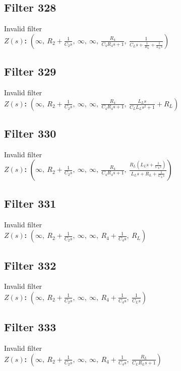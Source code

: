 \documentclass{article}
\begin{document}
\subsection*{Filter 328}
Invalid filter \\ 
\textbf{$Z(s)$:} $\left( \infty, \  R_{2} + \frac{1}{C_{2} s}, \  \infty, \  \infty, \  \frac{R_{4}}{C_{4} R_{4} s + 1}, \  \frac{1}{C_{L} s + \frac{1}{R_{L}} + \frac{1}{L_{L} s}}\right)$ \\ 
\subsection*{Filter 329}
Invalid filter \\ 
\textbf{$Z(s)$:} $\left( \infty, \  R_{2} + \frac{1}{C_{2} s}, \  \infty, \  \infty, \  \frac{R_{4}}{C_{4} R_{4} s + 1}, \  \frac{L_{L} s}{C_{L} L_{L} s^{2} + 1} + R_{L}\right)$ \\ 
\subsection*{Filter 330}
Invalid filter \\ 
\textbf{$Z(s)$:} $\left( \infty, \  R_{2} + \frac{1}{C_{2} s}, \  \infty, \  \infty, \  \frac{R_{4}}{C_{4} R_{4} s + 1}, \  \frac{R_{L} \left(L_{L} s + \frac{1}{C_{L} s}\right)}{L_{L} s + R_{L} + \frac{1}{C_{L} s}}\right)$ \\ 
\subsection*{Filter 331}
Invalid filter \\ 
\textbf{$Z(s)$:} $\left( \infty, \  R_{2} + \frac{1}{C_{2} s}, \  \infty, \  \infty, \  R_{4} + \frac{1}{C_{4} s}, \  R_{L}\right)$ \\ 
\subsection*{Filter 332}
Invalid filter \\ 
\textbf{$Z(s)$:} $\left( \infty, \  R_{2} + \frac{1}{C_{2} s}, \  \infty, \  \infty, \  R_{4} + \frac{1}{C_{4} s}, \  \frac{1}{C_{L} s}\right)$ \\ 
\subsection*{Filter 333}
Invalid filter \\ 
\textbf{$Z(s)$:} $\left( \infty, \  R_{2} + \frac{1}{C_{2} s}, \  \infty, \  \infty, \  R_{4} + \frac{1}{C_{4} s}, \  \frac{R_{L}}{C_{L} R_{L} s + 1}\right)$ \\ 
\end{document}
